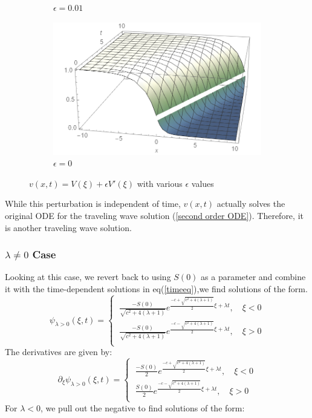 \documentclass[12pt]{article}
\begin{document}
\begin{figure}[H]
\begin{subfigure}[h]{0.4\textwidth}
        \caption{$\epsilon=0.01$}
        \label{fig:t10}
    \end{subfigure}
    \begin{subfigure}[h]{0.4\textwidth}
        \includegraphics[width=\textwidth]{Part2Plots/e0}
        \caption{$\epsilon=0$}
        \label{fig:e0}
    \end{subfigure}
    \caption{$v(x,t) = V(\xi) + \epsilon V'(\xi)$ with various $\epsilon$ values}\label{fig:epsilonplots}
\end{figure}

While this perturbation is independent of time, $v(x,t)$ actually solves the original ODE for the traveling wave solution (\ref{second order ODE}). Therefore, it is another traveling wave solution.

\subsubsection{$\lambda \neq 0$ Case}
Looking at this case, we revert back to using $S(0)$ as a parameter and combine it with the time-dependent solutions in eq(\ref{timeeq}),we find  solutions of the form.
\begin{equation}\label{solnlambda+}
\psi_{\lambda >0}(\xi,t)=
\begin{cases}
\ \frac{-S(0)}{\sqrt{c^2+4(\lambda+1)}}e^{\frac{-c+\sqrt{c^2+4(\lambda+1)}}{2}\xi+\lambda t},\quad \xi < 0 \\
\ \frac{-S(0)}{\sqrt{c^2+4(\lambda+1)}}e^{\frac{-c-\sqrt{c^2+4(\lambda+1)}}{2}\xi+\lambda t},\quad \xi > 0\\
\end{cases}
\end{equation}
The derivatives are given by:
\begin{equation}\label{solndevlambda+}
\partial_{\xi} \psi_{\lambda >0}(\xi,t)=
\begin{cases}
\ \frac{-S(0)}{2}e^{\frac{-c+\sqrt{c^2+4(\lambda+1)}}{2}\xi+\lambda t},\quad \xi < 0 \\
\ \frac{S(0)}{2}e^{\frac{-c-\sqrt{c^2+4(\lambda+1)}}{2}\xi+\lambda t},\quad \xi > 0\\
\end{cases}
\end{equation}
For $\lambda < 0$, we pull out the negative to find solutions of the form:
\end{document}
